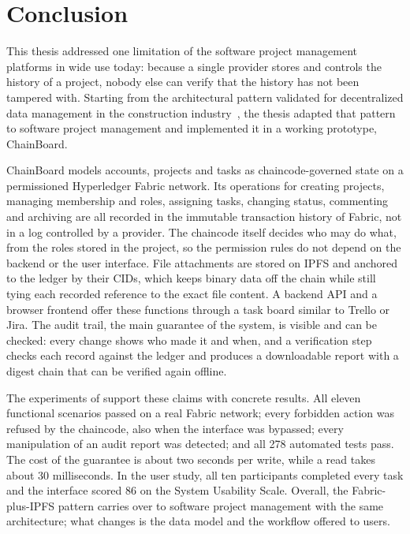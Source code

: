 \chapter{Conclusion}
\label{ch:conclusion}

This thesis addressed one limitation of the software project management platforms in wide use today: because a single provider stores and controls the history of a project, nobody else can verify that the history has not been tampered with. Starting from the architectural pattern validated for decentralized data management in the construction industry~\cite{adel2023}, the thesis adapted that pattern to software project management and implemented it in a working prototype, ChainBoard.

ChainBoard models accounts, projects and tasks as chaincode-governed state on a permissioned Hyperledger Fabric network. Its operations for creating projects, managing membership and roles, assigning tasks, changing status, commenting and archiving are all recorded in the immutable transaction history of Fabric, not in a log controlled by a provider. The chaincode itself decides who may do what, from the roles stored in the project, so the permission rules do not depend on the backend or the user interface. File attachments are stored on IPFS and anchored to the ledger by their CIDs, which keeps binary data off the chain while still tying each recorded reference to the exact file content. A backend API and a browser frontend offer these functions through a task board similar to Trello or Jira. The audit trail, the main guarantee of the system, is visible and can be checked: every change shows who made it and when, and a verification step checks each record against the ledger and produces a downloadable report with a digest chain that can be verified again offline.

The experiments of  support these claims with concrete results. All eleven functional scenarios passed on a real Fabric network; every forbidden action was refused by the chaincode, also when the interface was bypassed; every manipulation of an audit report was detected; and all 278 automated tests pass. The cost of the guarantee is about two seconds per write, while a read takes about 30 milliseconds. In the user study, all ten participants completed every task and the interface scored 86 on the System Usability Scale. Overall, the Fabric-plus-IPFS pattern carries over to software project management with the same architecture; what changes is the data model and the workflow offered to users.

